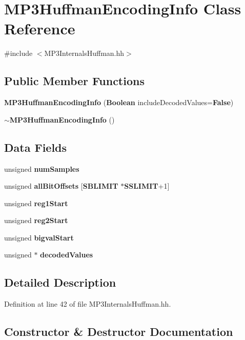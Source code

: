 \section{M\+P3\+Huffman\+Encoding\+Info Class Reference}
\label{classMP3HuffmanEncodingInfo}


{\ttfamily \#include $<$M\+P3\+Internals\+Huffman.\+hh$>$}

\subsection*{Public Member Functions}
\begin{DoxyCompactItemize}
\item 
{\bf M\+P3\+Huffman\+Encoding\+Info} ({\bf Boolean} include\+Decoded\+Values={\bf False})
\item 
{\bf $\sim$\+M\+P3\+Huffman\+Encoding\+Info} ()
\end{DoxyCompactItemize}
\subsection*{Data Fields}
\begin{DoxyCompactItemize}
\item 
unsigned {\bf num\+Samples}
\item 
unsigned {\bf all\+Bit\+Offsets} [{\bf S\+B\+L\+I\+M\+I\+T} $\ast${\bf S\+S\+L\+I\+M\+I\+T}+1]
\item 
unsigned {\bf reg1\+Start}
\item 
unsigned {\bf reg2\+Start}
\item 
unsigned {\bf bigval\+Start}
\item 
unsigned $\ast$ {\bf decoded\+Values}
\end{DoxyCompactItemize}


\subsection{Detailed Description}


Definition at line 42 of file M\+P3\+Internals\+Huffman.\+hh.



\subsection{Constructor \& Destructor Documentation}
